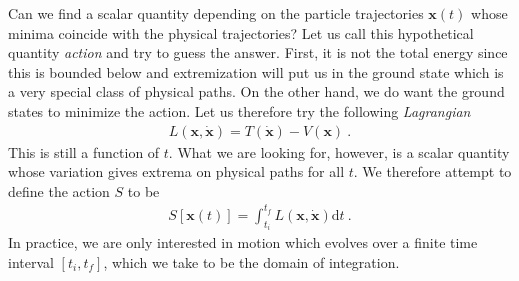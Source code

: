 \documentclass[12pt]{article}
\begin{document}
Can we find a scalar quantity depending on the particle trajectories $\mathbf x(t)$ whose minima coincide with the physical trajectories? Let us call this hypothetical quantity {\em action} and try to guess the answer. First, it is not the total energy since this is bounded below and extremization will put us in the ground state which is a very special class of physical paths. On the other hand, we do want the ground states to minimize the action. Let us therefore try the following {\em Lagrangian}
\begin{eqnarray}
L(\mathbf x, \dot {\mathbf x})=T(\dot {\mathbf x})-V(\mathbf x)~.
\end{eqnarray}
This is still a function of $t$. What we are looking for, however, is a scalar quantity whose variation gives extrema on physical paths for all $t$. We therefore attempt to define the action $S$ to be
\begin{eqnarray}
S[\mathbf x(t)]=\int_{t_i}^{t_f} L(\mathbf x, \dot{\mathbf x}) \mathrm d t~.
\end{eqnarray}
In practice, we are only interested in motion which evolves over a finite time interval $[t_i,t_f]$, which we take to be the domain of integration. 
\end{document}
